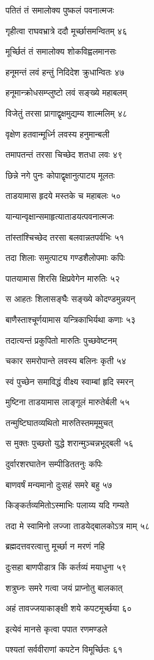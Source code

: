 पतितं तं समालोक्य पुष्कलं पवनात्मजः

गृहीत्वा राघवभ्रात्रे ददौ मूर्च्छासमन्वितम् ४६

मूर्च्छितं तं समालोक्य शोकविह्वलमानसः

हनूमन्तं लवं हन्तुं निदिदेश क्रुधान्वितः ४७

हनूमान्क्रोधसम्प्लुष्टो लवं सङ्ख्ये महाबलम्

विजेतुं तरसा प्रागाद्वृक्षमुद्यम्य शाल्मलिम् ४८

वृक्षेण हतवान्मूर्ध्नि लवस्य हनुमान्बली

तमापतन्तं तरसा चिच्छेद शतधा लवः ४९

छिन्ने नगे पुनः कोपाद्वृक्षानुत्पाट्य मूलतः

ताडयामास हृदये मस्तके च महाबलः ५०

यान्यान्वृक्षान्समाहृत्याताडयत्पवनात्मजः

तांस्तांश्चिच्छेद तरसा बलवान्नतपर्वभिः ५१

तदा शिलाः समुत्पाट्य गण्डशैलोपमाः कपिः

पातयामास शिरसि क्षिप्रवेगेन मारुतिः ५२

स आहतः शिलासङ्घैः सङ्ख्ये कोदण्डमुन्नयन्

बाणैस्ताश्चूर्णयामास यन्त्रिकाभिर्यथा कणाः ५३

तदात्यन्तं प्रकुपितो मारुतिः पुच्छवेष्टनम्

चकार समरोपान्ते लवस्य बलिनः कृती ५४

स्वं पुच्छेन समाविद्धं वीक्ष्य स्वाम्बां हृदि स्मरन्

मुष्टिना ताडयामास लाङ्गूलं मारुतेर्बली ५५

तन्मुष्टिघातव्यथितो मारुतिस्तममूमुचत्

स मुक्तः पुच्छतो युद्धे शरान्मुञ्चन्नभूद्बली ५६

दुर्वारशरघातेन सम्पीडिततनुः कपिः

बाणवर्षं मन्यमानो दुःसहं समरे बहु ५७

किङ्कर्तव्यमितोऽस्माभिः पलाय्य यदि गम्यते

तदा मे स्वामिनो लज्जा ताडयेद्बालकोऽत्र माम् ५८

ब्रह्मदत्तवरत्वात्तु मूर्च्छा न मरणं नहि

दुःसहा बाणपीडात्र किं कर्तव्यं मयाधुना ५९

शत्रुघ्नः समरे गत्वा जयं प्राप्नोतु बालकात्

अहं तावज्जयाकाङ्क्षी शये कपटमूर्च्छया ६०

इत्येवं मानसे कृत्वा पपात रणमण्डले

पश्यतां सर्ववीराणां कपटेन विमूर्च्छितः ६१

